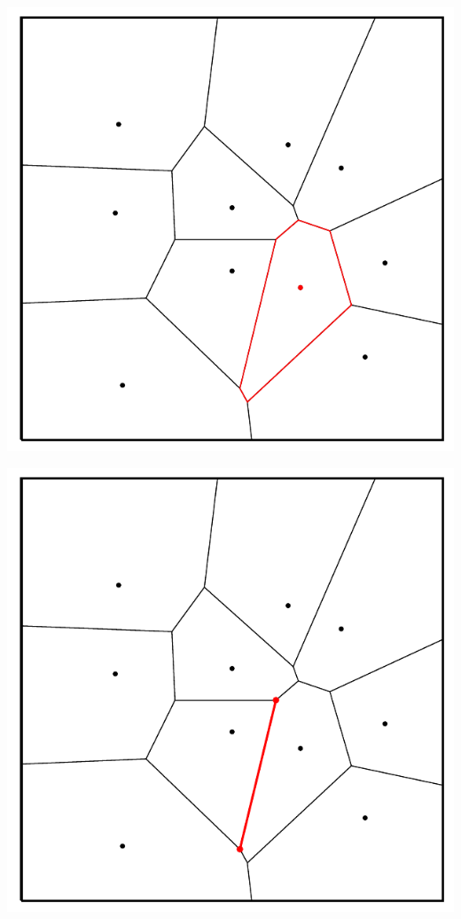 \begin{frame}[fragile]
\begin{overprint}
\begin{center}
\includegraphics[height=0.9\textheight]{fig/voronoi-v1}
\par\end{center}


\begin{center}
\includegraphics[height=0.9\textheight]{fig/voronoi-v2}
\par\end{center}





\end{overprint}
\end{frame}
